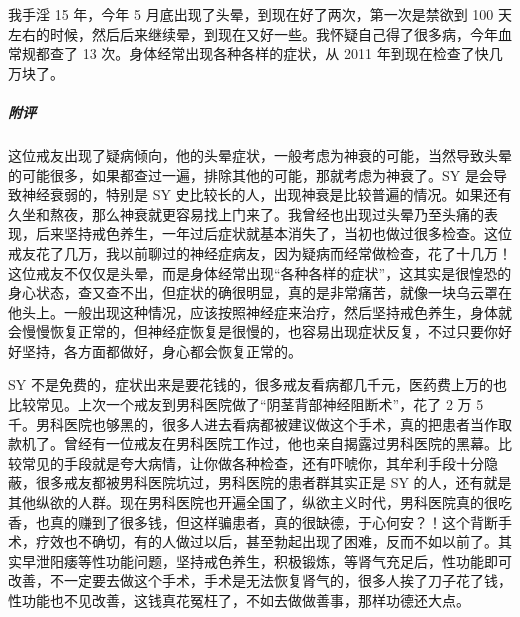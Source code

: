 \begin{case}
    我手淫 15 年，今年 5 月底出现了头晕，到现在好了两次，第一次是禁欲到 100 天左右的时候，然后后来继续晕，到现在又好一些。我怀疑自己得了很多病，今年血常规都查了 13 次。身体经常出现各种各样的症状，从 2011 年到现在检查了快几万块了。
    \subparagraph{附评} 这位戒友出现了疑病倾向，他的头晕症状，一般考虑为神衰的可能，当然导致头晕的可能很多，如果都查过一遍，排除其他的可能，那就考虑为神衰了。SY 是会导致神经衰弱的，特别是 SY 史比较长的人，出现神衰是比较普遍的情况。如果还有久坐和熬夜，那么神衰就更容易找上门来了。我曾经也出现过头晕乃至头痛的表现，后来坚持戒色养生，一年过后症状就基本消失了，当初也做过很多检查。这位戒友花了几万，我以前聊过的神经症病友，因为疑病而经常做检查，花了十几万！这位戒友不仅仅是头晕，而是身体经常出现“各种各样的症状”，这其实是很惶恐的身心状态，查又查不出，但症状的确很明显，真的是非常痛苦，就像一块乌云罩在他头上。一般出现这种情况，应该按照神经症来治疗，然后坚持戒色养生，身体就会慢慢恢复正常的，但神经症恢复是很慢的，也容易出现症状反复，不过只要你好好坚持，各方面都做好，身心都会恢复正常的。

    SY 不是免费的，症状出来是要花钱的，很多戒友看病都几千元，医药费上万的也比较常见。上次一个戒友到男科医院做了“阴茎背部神经阻断术”，花了 2 万 5 千。男科医院也够黑的，很多人进去看病都被建议做这个手术，真的把患者当作取款机了。曾经有一位戒友在男科医院工作过，他也亲自揭露过男科医院的黑幕。比较常见的手段就是夸大病情，让你做各种检查，还有吓唬你，其牟利手段十分隐蔽，很多戒友都被男科医院坑过，男科医院的患者群其实正是 SY 的人，还有就是其他纵欲的人群。现在男科医院也开遍全国了，纵欲主义时代，男科医院真的很吃香，也真的赚到了很多钱，但这样骗患者，真的很缺德，于心何安？！这个背断手术，疗效也不确切，有的人做过以后，甚至勃起出现了困难，反而不如以前了。其实早泄阳痿等性功能问题，坚持戒色养生，积极锻炼，等肾气充足后，性功能即可改善，不一定要去做这个手术，手术是无法恢复肾气的，很多人挨了刀子花了钱，性功能也不见改善，这钱真花冤枉了，不如去做做善事，那样功德还大点。
\end{case}

